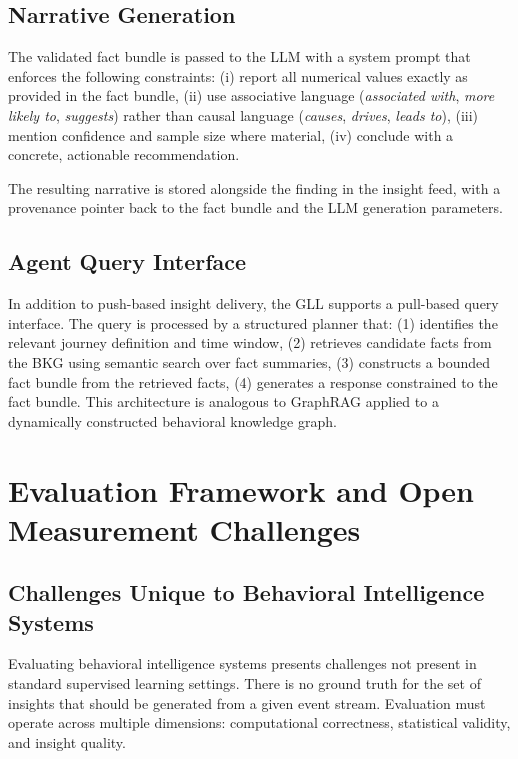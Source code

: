 \documentclass[12pt, a4paper]{article}
\begin{document}
\subsection{Narrative Generation}

The validated fact bundle is passed to the LLM with a system prompt that enforces the following constraints: (i) report all numerical values exactly as provided in the fact bundle, (ii) use associative language (\textit{associated with}, \textit{more likely to}, \textit{suggests}) rather than causal language (\textit{causes}, \textit{drives}, \textit{leads to}), (iii) mention confidence and sample size where material, (iv) conclude with a concrete, actionable recommendation.

The resulting narrative is stored alongside the finding in the insight feed, with a provenance pointer back to the fact bundle and the LLM generation parameters.

\subsection{Agent Query Interface}

In addition to push-based insight delivery, the GLL supports a pull-based query interface. The query is processed by a structured planner that: (1) identifies the relevant journey definition and time window, (2) retrieves candidate facts from the BKG using semantic search over fact summaries, (3) constructs a bounded fact bundle from the retrieved facts, (4) generates a response constrained to the fact bundle. This architecture is analogous to GraphRAG applied to a dynamically constructed behavioral knowledge graph.

\section{Evaluation Framework and Open Measurement Challenges}
\label{sec:evaluation}

\subsection{Challenges Unique to Behavioral Intelligence Systems}

Evaluating behavioral intelligence systems presents challenges not present in standard supervised learning settings. There is no ground truth for the set of insights that should be generated from a given event stream. Evaluation must operate across multiple dimensions: computational correctness, statistical validity, and insight quality.
\end{document}
